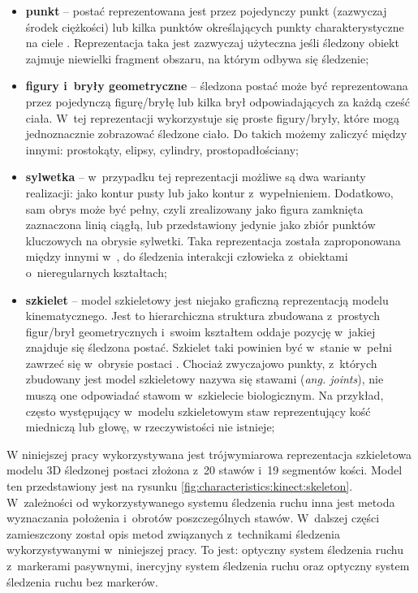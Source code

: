 \begin{itemize}
	\item \textbf{punkt} -- postać reprezentowana jest przez pojedynczy punkt (zazwyczaj środek ciężkości) \cite{Veenman2001} lub kilka punktów określających punkty charakterystyczne na ciele \cite{Serby2004}. Reprezentacja taka jest zazwyczaj użyteczna jeśli śledzony obiekt zajmuje niewielki fragment obszaru, na którym odbywa się śledzenie;
	\item \textbf{figury i~bryły geometryczne} -- śledzona postać może być reprezentowana przez pojedynczą figurę/bryłę \cite{Comaniciu2003} lub kilka brył odpowiadających za każdą cześć ciała. W~tej reprezentacji wykorzystuje się proste figury/bryły, które mogą jednoznacznie zobrazować śledzone ciało. Do takich możemy zaliczyć między innymi: prostokąty, elipsy, cylindry, prostopadłościany;
	\item \textbf{sylwetka} -- w~przypadku tej reprezentacji możliwe są dwa warianty realizacji: jako kontur pusty lub jako kontur z~wypełnieniem. Dodatkowo, sam obrys może być pełny, czyli zrealizowany jako figura zamknięta zaznaczona linią ciągłą, lub przedstawiony jedynie jako zbiór punktów kluczowych na obrysie sylwetki. Taka reprezentacja została zaproponowana między innymi w~\cite{Yilmaz2004}, do śledzenia interakcji człowieka z~obiektami o~nieregularnych kształtach;
	\item \textbf{szkielet} -- model szkieletowy jest niejako graficzną reprezentacją modelu kinematycznego. Jest to hierarchiczna struktura zbudowana z~prostych figur/brył geometrycznych i~swoim kształtem oddaje pozycję w~jakiej znajduje się śledzona postać. Szkielet taki powinien być w~stanie w~pełni zawrzeć się w~obrysie postaci \cite{Ali2001}. Chociaż zwyczajowo punkty, z~których zbudowany jest model szkieletowy nazywa się stawami (\emph{ang. joints}), nie muszą one odpowiadać stawom w~szkielecie biologicznym. Na przykład, często występujący w~modelu szkieletowym staw reprezentujący kość miedniczą lub głowę, w rzeczywistości nie istnieje;
\end{itemize}
															
W niniejszej pracy wykorzystywana jest trójwymiarowa reprezentacja szkieletowa modelu 3D śledzonej postaci złożona z~20 stawów i~19 segmentów kości. Model ten przedstawiony jest na rysunku \ref{fig:characteristics:kinect:skeleton}. W~zależności od wykorzystywanego systemu śledzenia ruchu inna jest metoda wyznaczania położenia i~obrotów poszczególnych stawów. W~dalszej części zamieszczony został opis metod związanych z~technikami śledzenia wykorzystywanymi w~niniejszej pracy. To jest: optyczny system śledzenia ruchu z~markerami pasywnymi, inercyjny system śledzenia ruchu oraz optyczny system śledzenia ruchu bez markerów.

